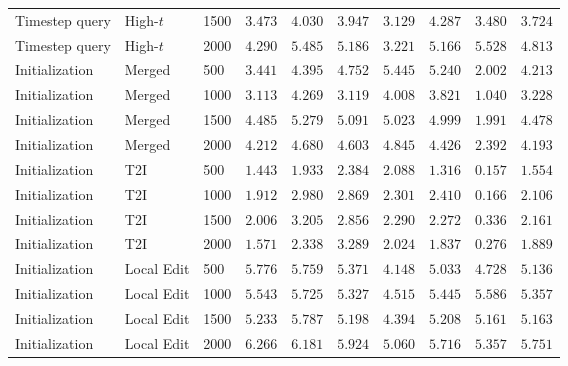 \begin{table}[H]
{\begin{tabular}{lll|ccccccc}
    Timestep query & High-$t$ & 1500 & $3.473$ & $4.030$ & $3.947$ & $3.129$ & $4.287$ & $3.480$ & $3.724$\\
    Timestep query & High-$t$ & 2000 & $4.290$ & $5.485$ & $5.186$ & $3.221$ & $5.166$ & $5.528$ & $4.813$\\
    \midrule
    Initialization & Merged & 500 & $3.441$ & $4.395$ & $4.752$ & $5.445$ & $5.240$ & $2.002$ & $4.213$\\
    Initialization & Merged & 1000 & $3.113$ & $4.269$ & $3.119$ & $4.008$ & $3.821$ & $1.040$ & $3.228$\\
    Initialization & Merged & 1500 & $4.485$ & $5.279$ & $5.091$ & $5.023$ & $4.999$ & $1.991$ & $4.478$\\
    Initialization & Merged & 2000 & $4.212$ & $4.680$ & $4.603$ & $4.845$ & $4.426$ & $2.392$ & $4.193$\\
    Initialization & T2I & 500 & $1.443$ & $1.933$ & $2.384$ & $2.088$ & $1.316$ & $0.157$ & $1.554$\\
    Initialization & T2I & 1000 & $1.912$ & $2.980$ & $2.869$ & $2.301$ & $2.410$ & $0.166$ & $2.106$\\
    Initialization & T2I & 1500 & $2.006$ & $3.205$ & $2.856$ & $2.290$ & $2.272$ & $0.336$ & $2.161$\\
    Initialization & T2I & 2000 & $1.571$ & $2.338$ & $3.289$ & $2.024$ & $1.837$ & $0.276$ & $1.889$\\
    Initialization & Local Edit & 500 & $5.776$ & $5.759$ & $5.371$ & $4.148$ & $5.033$ & $4.728$ & $5.136$\\
    Initialization & Local Edit & 1000 & $5.543$ & $5.725$ & $5.327$ & $4.515$ & $5.445$ & $5.586$ & $5.357$\\
    Initialization & Local Edit & 1500 & $5.233$ & $5.787$ & $5.198$ & $4.394$ & $5.208$ & $5.161$ & $5.163$\\
    Initialization & Local Edit & 2000 & $6.266$ & $6.181$ & $5.924$ & $5.060$ & $5.716$ & $5.357$ & $5.751$\\

\end{tabular}}
\end{table}
